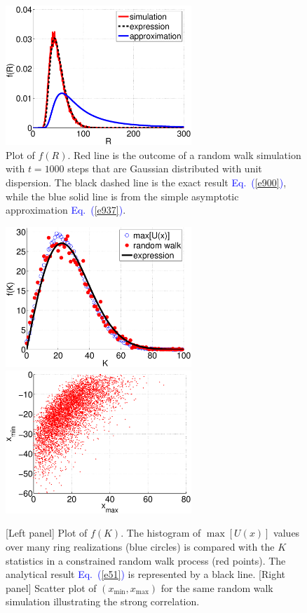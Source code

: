 \documentclass[aps,prl,floats,floatfix,twocolumn]{revtex4}
\newcommand{\Eq}[1]{\textcolor{blue}{Eq.\!\!~(\ref{#1})}}
\begin{document}



\begin{figure}[H!]

\includegraphics[width=7cm]{PB_sim.eps}

\caption{
Plot of $f(R)$. Red line is the outcome of a random walk simulation with ${t=1000}$ 
steps that are Gaussian distributed with unit dispersion.   
The black dashed line is the exact result \Eq{e900}, 
while the blue solid line is from the simple asymptotic approximation \Eq{e937}.} 

\label{fb}
\end{figure}


\begin{figure}[H!]
\includegraphics[width=7cm]{f_K.eps} 
\includegraphics[width=7cm]{MinMax.eps} 

\caption{
[Left panel] Plot of $f(K)$. 
The histogram of $\max[U(x)]$ values over many ring realizations (blue circles)  
is compared with the $K$ statistics in a constrained random walk process (red points).
The analytical result \Eq{e51} is represented by a black line.
[Right panel] Scatter plot of ${(x_{\text{min}}, x_{\text{max}})}$ for the 
same random walk simulation illustrating the strong correlation. }

\label{pu}
\end{figure}
\end{document}
